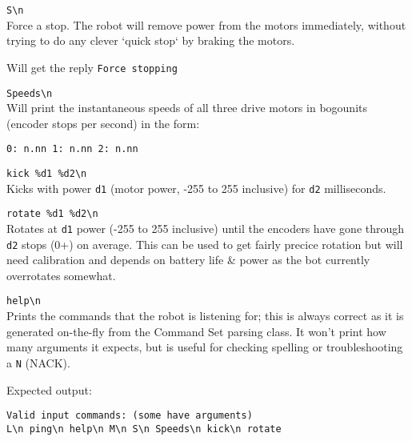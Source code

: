 \verb|S\n|\\
Force a stop. The robot will remove power from the motors immediately, without trying to do any clever `quick stop` by braking the motors.

Will get the reply \verb|Force stopping|

\verb|Speeds\n|\\
Will print the instantaneous speeds of all three drive motors in bogounits (encoder stops per second) in the form:

\verb|0: n.nn 1: n.nn 2: n.nn|

\verb|kick %d1 %d2\n|\\
Kicks with power \texttt{d1} (motor power, -255 to 255 inclusive) for \texttt{d2} milliseconds.

\verb|rotate %d1 %d2\n|\\
Rotates at \texttt{d1} power (-255 to 255 inclusive) until the encoders have gone through \texttt{d2} stops (0+) on average. This can be used to get fairly precice rotation but will need calibration and depends on battery life \& power as the bot currently overrotates somewhat.

\verb|help\n|\\
Prints the commands that the robot is listening for; this is always correct as it is generated on-the-fly from the Command Set parsing class. It won't print how many arguments it expects, but is useful for checking spelling or troubleshooting a \texttt{N} (NACK).

Expected output:
\begin{verbatim}
Valid input commands: (some have arguments)
L\n ping\n help\n M\n S\n Speeds\n kick\n rotate
\end{verbatim}
